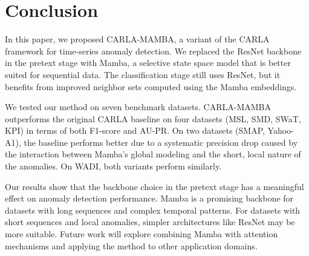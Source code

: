 \documentclass{svproc}
\begin{document}
\section{Conclusion}

In this paper, we proposed CARLA-MAMBA, a variant of the CARLA framework for time-series anomaly detection. We replaced the ResNet backbone in the pretext stage with Mamba, a selective state space model that is better suited for sequential data. The classification stage still uses ResNet, but it benefits from improved neighbor sets computed using the Mamba embeddings.

We tested our method on seven benchmark datasets. CARLA-MAMBA outperforms the original CARLA baseline on four datasets (MSL, SMD, SWaT, KPI) in terms of both F1-score and AU-PR. On two datasets (SMAP, Yahoo-A1), the baseline performs better due to a systematic precision drop caused by the interaction between Mamba's global modeling and the short, local nature of the anomalies. On WADI, both variants perform similarly.

Our results show that the backbone choice in the pretext stage has a meaningful effect on anomaly detection performance. Mamba is a promising backbone for datasets with long sequences and complex temporal patterns. For datasets with short sequences and local anomalies, simpler architectures like ResNet may be more suitable. Future work will explore combining Mamba with attention mechanisms and applying the method to other application domains.



\end{document}
